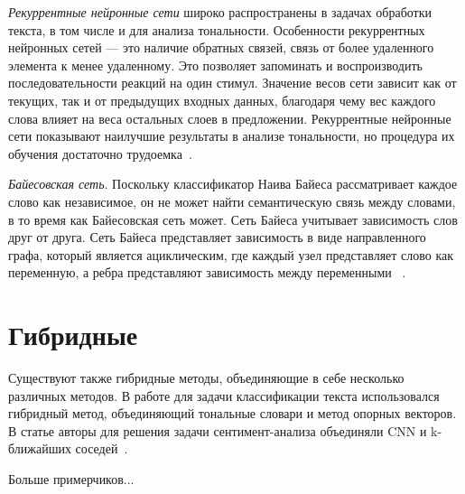 \textit{Рекуррентные нейронные сети} широко распространены в задачах обработки
текста, в том числе и для анализа тональности. Особенности рекуррентных
нейронных сетей --- это наличие обратных связей, связь от более удаленного
элемента к менее удаленному. Это позволяет запоминать и воспроизводить
последовательности реакций на один стимул. Значение весов сети зависит как от
текущих, так и от предыдущих входных данных, благодаря чему вес каждого слова
влияет на веса остальных слоев в предложении.  Рекуррентные нейронные сети
показывают наилучшие результаты в анализе тональности, но процедура их обучения
достаточно трудоемка~\cite{article9}.

\textit{Байесовская сеть}. Поскольку классификатор Наива Байеса рассматривает
каждое слово как независимое, он не может найти семантическую связь между
словами, в то время как Байесовская сеть может. Сеть Байеса учитывает
зависимость слов друг от друга. Сеть Байеса представляет зависимость в виде
направленного графа, который является ациклическим, где каждый узел представляет
слово как переменную, а ребра представляют зависимость между переменными
~\cite{article16}.

\section{Гибридные}

Существуют также гибридные методы, объединяющие в себе несколько различных
методов.  В работе для задачи классификации текста использовался гибридный
метод, объединяющий тональные словари и метод опорных векторов.  В статье
авторы для решения задачи сентимент-анализа объединяли CNN и k-ближайших
соседей~\cite{article14}.

Больше примерчиков...


